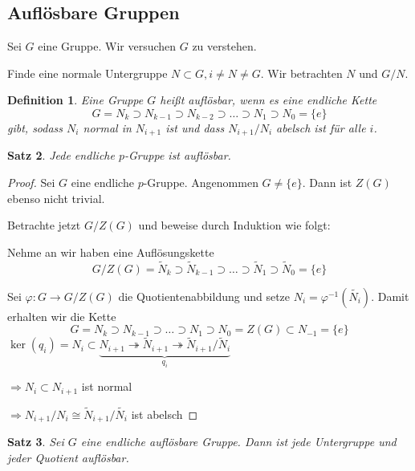 \documentclass[a4paper,12pt,numbers=noenddot,parskip=full]{scrartcl}
\theoremstyle{dotless}
\newtheorem{theorem}{Satz}[section]
\newtheorem{definition}[theorem]{Definition}
\theoremstyle{remark}
\begin{document}
	\subsection{Auflösbare Gruppen}
	
	Sei $G$ eine Gruppe. Wir versuchen $G$ zu verstehen.
	
	Finde eine normale Untergruppe $N \subset G, i \neq N \neq G$. Wir betrachten $N$ und $G/N$.
	
	\begin{definition}
		Eine Gruppe $G$ heißt auflösbar, wenn es eine endliche Kette
		\begin{equation*}
			G = N_k \supset N_{k-1} \supset N_{k-2} \supset \dots \supset N_1 \supset N_0 = \{ e \}
		\end{equation*}
		gibt, sodass $N_i$ normal in $N_{i+1}$ ist und dass $N_{i+1}/N_i$ abelsch ist für alle $i$.
	\end{definition}

	\begin{theorem}
		Jede endliche $p$-Gruppe ist auflösbar.
	\end{theorem}
	
	\begin{proof}
		Sei $G$ eine endliche $p$-Gruppe. Angenommen $G \neq \{ e \}$. Dann ist $Z(G)$ ebenso nicht trivial.
		
		Betrachte jetzt $G/Z(G)$ und beweise durch Induktion wie folgt:
		
		Nehme an wir haben eine Auflösungskette
		\begin{equation*}
			G/Z(G) = \tilde{N}_k \supset \tilde{N}_{k-1} \supset \dots \supset \tilde{N}_1 \supset \tilde{N}_0 = \{ e \}
		\end{equation*}
		
		Sei $\varphi: G \to G/Z(G)$ die Quotientenabbildung und setze $N_i = \varphi^{-1}(\tilde{N_i})$. Damit erhalten wir die Kette
		\begin{equation*}
			G = N_k \supset N_{k-1} \supset \dots \supset N_1 \supset N_0 = Z(G) \subset N_{-1} = \{ e \}
		\end{equation*}
		$\ker(q_i) = N_i \subset\underbrace{ N_{i+1} \twoheadrightarrow \tilde{N}_{i+1} \twoheadrightarrow \tilde{N}_{i+1}/\tilde{N}_i}_{q_i}$
		
		$\Rightarrow N_i \subset N_{i+1}$ ist normal
		
		$\Rightarrow N_{i+1}/N_i \cong \tilde{N}_{i+1}/\tilde{N_i}$ ist abelsch		
	\end{proof}

	\begin{theorem}
		Sei $G$ eine endliche auflösbare Gruppe. Dann ist jede Untergruppe und jeder Quotient auflösbar.
	\end{theorem}
\end{document}
